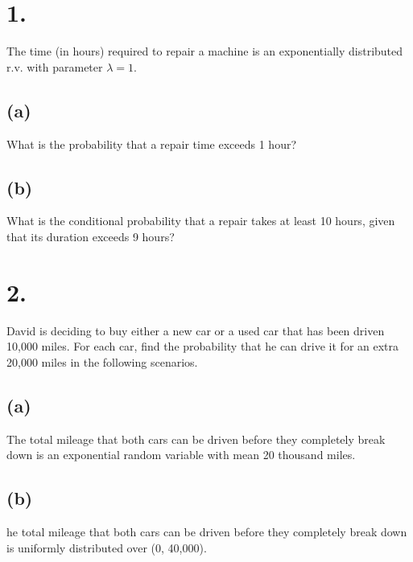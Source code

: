 \documentclass{article}
\begin{document}
\thispagestyle{firstpageheader}

\section*{1.}
{\Large 

The time (in hours) required to repair a machine is an exponentially distributed r.v. with
parameter $\lambda = 1$.

\subsection*{(a)}
What is the probability that a repair time exceeds 1 hour?


\subsection*{(b)}
What is the conditional probability that a repair takes at least 10 hours, given that its duration
exceeds 9 hours?


}

\section*{2.}
{\Large

David is deciding to buy either a new car or a used car that has been driven 10,000 miles. For
each car, find the probability that he can drive it for an extra 20,000 miles in the following
scenarios.

\subsection*{(a)}
The total mileage that both cars can be driven before they completely break down is an
exponential random variable with mean 20 thousand miles.


\subsection*{(b)}
he total mileage that both cars can be driven before they completely break down is
uniformly distributed over (0, 40,000).


}
\end{document}
